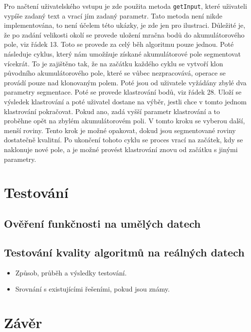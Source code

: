 \documentclass[11pt,twoside,a4paper]{book}
\begin{document}
Pro načtení uživatelského vstupu je zde použita metoda \verb|getInput|, které uživateli vypíše zadaný text a vrací jím zadaný parametr. Tato metoda není nikde implementována, to není účelem této ukázky, je zde jen pro ilustraci. Důležité je, že po zadání velikosti okolí se provede uložení mračna bodů do akumulátorového pole, viz řádek 13. Toto se provede za celý běh algoritmu pouze jednou.  Poté následuje cyklus, který nám umožňuje získané akumulátorové pole segmentovat vícekrát. To je zajištěno tak, že na začátku každého cyklu se vytvoří klon původního akumulátorového pole, které se vůbec nezpracovává, operace se provádí pouze nad klonovaným polem. Poté jsou od uživatele vyžádány zbylé dva parametry segmentace. Poté se provede klastrování bodů, viz řádek 28. Uloží se výsledek klastrování a poté uživatel dostane na výběr, jestli chce v tomto jednom klastrování pokračovat. Pokud ano, zadá vyšší parametr klastrování a to proběhne opět na zbylém akumulátorovém poli. V tomto kroku se vyberou další, menší roviny. Tento krok je možné opakovat, dokud jsou segmentované roviny dostatečně kvalitní. Po ukončení tohoto cyklu se proces vrací na začátek, kdy se naklonuje nové pole, a je možné provést klastrování znovu od začátku s jinými parametry.


\chapter{Testování}
\label{chap:test}

\section{Ověření funkčnosti na umělých datech}

\section{Testování kvality algoritmů na reálných datech}

\begin{itemize}
 \item Způsob, průběh a výsledky testování.
 \item Srovnání s existujícími řešeními, pokud jsou známy.
\end{itemize} 


\chapter{Závěr}
\end{document}
